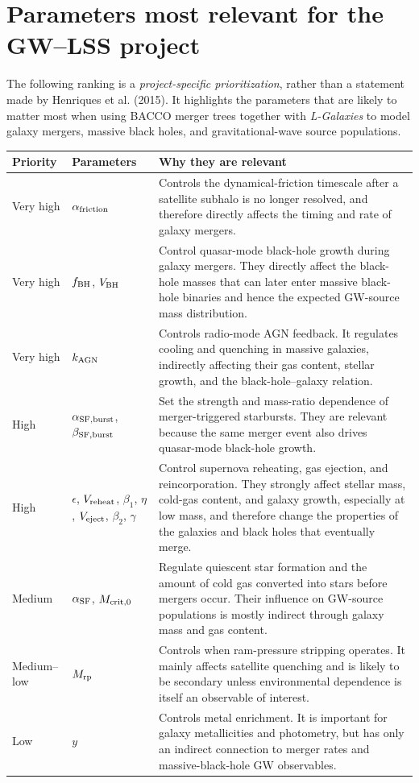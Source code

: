 \documentclass[11pt,a4paper]{article}
\begin{document}
\section{Parameters most relevant for the GW--LSS project}
The following ranking is a \emph{project-specific prioritization}, rather than a statement made by Henriques et al. (2015). It highlights the parameters that are likely to matter most when using BACCO merger trees together with \textit{L-Galaxies} to model galaxy mergers, massive black holes, and gravitational-wave source populations.

\newpage

\renewcommand{\arraystretch}{1.25}
\begin{longtable}{>{\raggedright\arraybackslash}p{2.0cm}>{\raggedright\arraybackslash}p{3.7cm}>{\raggedright\arraybackslash}p{8.0cm}}
\toprule
\textbf{Priority} & \textbf{Parameters} & \textbf{Why they are relevant}\\
\midrule
\endhead
Very high & $\alpha_{\rm friction}$ & Controls the dynamical-friction timescale after a satellite subhalo is no longer resolved, and therefore directly affects the timing and rate of galaxy mergers.\\
Very high & $f_{\rm BH}$, $V_{\rm BH}$ & Control quasar-mode black-hole growth during galaxy mergers. They directly affect the black-hole masses that can later enter massive black-hole binaries and hence the expected GW-source mass distribution.\\
Very high & $k_{\rm AGN}$ & Controls radio-mode AGN feedback. It regulates cooling and quenching in massive galaxies, indirectly affecting their gas content, stellar growth, and the black-hole--galaxy relation.\\
High & $\alpha_{\rm SF,burst}$, $\beta_{\rm SF,burst}$ & Set the strength and mass-ratio dependence of merger-triggered starbursts. They are relevant because the same merger event also drives quasar-mode black-hole growth.\\
High & $\epsilon$, $V_{\rm reheat}$, $\beta_1$, $\eta$, $V_{\rm eject}$, $\beta_2$, $\gamma$ & Control supernova reheating, gas ejection, and reincorporation. They strongly affect stellar mass, cold-gas content, and galaxy growth, especially at low mass, and therefore change the properties of the galaxies and black holes that eventually merge.\\
Medium & $\alpha_{\rm SF}$, $M_{{\rm crit},0}$ & Regulate quiescent star formation and the amount of cold gas converted into stars before mergers occur. Their influence on GW-source populations is mostly indirect through galaxy mass and gas content.\\
Medium--low & $M_{\rm rp}$ & Controls when ram-pressure stripping operates. It mainly affects satellite quenching and is likely to be secondary unless environmental dependence is itself an observable of interest.\\
Low & $y$ & Controls metal enrichment. It is important for galaxy metallicities and photometry, but has only an indirect connection to merger rates and massive-black-hole GW observables.\\
\bottomrule
\end{longtable}
\end{document}
